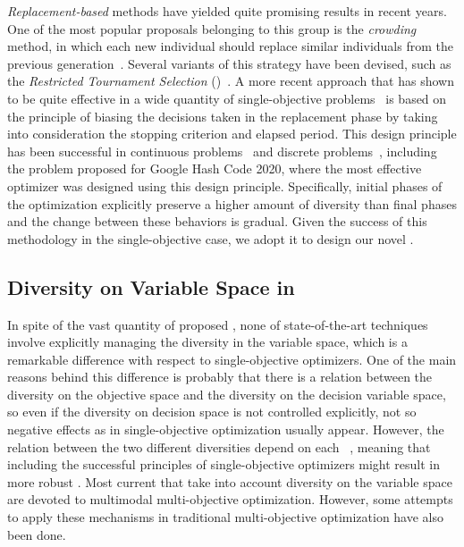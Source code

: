\textit{Replacement-based} methods have yielded quite promising results in recent years.
%
One of the most popular proposals belonging to this group is the \textit{crowding} method, 
in which each new individual should replace similar individuals from the previous generation~\cite{mengshoel2014adaptive}.
%
Several variants of this strategy have been devised, such as the \textit{Restricted Tournament Selection} 
(\RTS{})~\cite{harik1995finding}.
%
A more recent approach that has shown to be quite effective in a wide quantity of single-objective problems~\cite{segura2016improving}
is based on the principle of biasing the decisions taken in the replacement phase by taking into consideration the 
stopping criterion and elapsed period.
%
This design principle has been successful in continuous problems~\cite{castillo2019differential} and discrete 
problems~\cite{segura2016improving,romero2018memetic}, including the problem proposed for Google Hash Code 2020, where the most
effective optimizer was designed using this design principle.
%
Specifically, initial phases of the optimization explicitly preserve a higher amount of diversity than final phases and the
change between these behaviors is gradual.
%
Given the success of this methodology in the single-objective case, we adopt it to design our novel \MOEA{}.


\subsection{Diversity on Variable Space in \MOEAS{}}\label{MOEAs:Diversity}

In spite of the vast quantity of proposed \MOEAS{}, none of state-of-the-art techniques involve
explicitly managing the diversity in the variable space, which is a remarkable difference with respect
to single-objective optimizers.
%
One of the main reasons behind this difference is probably that there is a relation between the diversity on the objective 
space and the diversity on the decision variable space, so even if the diversity on decision space is not controlled explicitly,
not so negative effects as in single-objective optimization usually appear.
%
%
However, the relation between the two different diversities depend on each \MOP{}~\cite{shir2009enhancing}, meaning
that including the successful principles of single-objective optimizers might result in more robust \MOEAS{}.
%
Most current \MOEAS{} that take into account diversity on the variable space are devoted to multimodal multi-objective optimization.
%
However, some attempts to apply these mechanisms in traditional multi-objective optimization have also been done.

